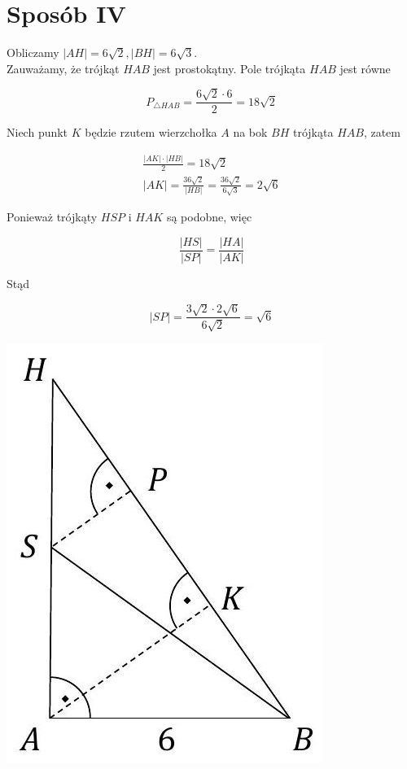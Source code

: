 \documentclass[10pt]{article}
\begin{document}
\section*{Sposób IV}
Obliczamy $|A H|=6 \sqrt{2},|B H|=6 \sqrt{3}$.\\
Zauważamy, że trójkąt $H A B$ jest prostokątny. Pole trójkąta $H A B$ jest równe

$$
P_{\triangle H A B}=\frac{6 \sqrt{2} \cdot 6}{2}=18 \sqrt{2}
$$

Niech punkt $K$ będzie rzutem wierzchołka $A$ na bok $B H$ trójkąta $H A B$, zatem

$$
\begin{gathered}
\frac{|A K| \cdot|H B|}{2}=18 \sqrt{2} \\
|A K|=\frac{36 \sqrt{2}}{|H B|}=\frac{36 \sqrt{2}}{6 \sqrt{3}}=2 \sqrt{6}
\end{gathered}
$$

Ponieważ trójkąty $H S P$ i $H A K$ są podobne, więc

$$
\frac{|H S|}{|S P|}=\frac{|H A|}{|A K|}
$$

Stąd

$$
|S P|=\frac{3 \sqrt{2} \cdot 2 \sqrt{6}}{6 \sqrt{2}}=\sqrt{6}
$$

\begin{center}
\includegraphics[max width=\textwidth]{2025_02_07_dcb3d059df06a3930b0ag-35}
\end{center}
\end{document}
